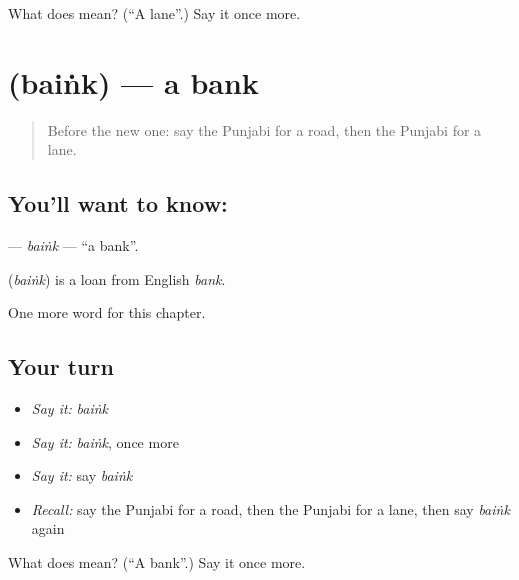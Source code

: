 \begin{tcolorbox}[breakable,colback=teal!4,colframe=teal!35!black,title={Before you move on}]
What does  mean? (\textquotedblleft{}A lane\textquotedblright{}.) Say it once more.
\end{tcolorbox}
\section[\texorpdfstring{\pa{ਬੈਂਕ} (baiṅk)}{ਬੈਂਕ (baiṅk)}]{ (baiṅk) — a bank}

\label{lesson:PA-C90-baink}



\begin{quote}
Before the new one: say the Punjabi for a road, then the Punjabi for a lane.
\end{quote}

\subsection*{You'll want to know: }
\textbf{} — \emph{baiṅk} — \textquotedblleft{}a bank\textquotedblright{}.

\begin{cousinweb}
\textbf{} (\emph{baiṅk}) is a loan from English \emph{bank}.
\end{cousinweb}

\begin{grammarlens}[title={What you've built}]
One more word for this chapter.
\end{grammarlens}

\subsection*{Your turn}
\begin{itemize}
\raggedright
  \item \emph{Say it:} \emph{baiṅk}
  \item \emph{Say it:} \emph{baiṅk}, once more
  \item \emph{Say it:} say \emph{baiṅk}
  \item \emph{Recall:} say the Punjabi for a road, then the Punjabi for a lane, then say \emph{baiṅk} again
\end{itemize}

\begin{tcolorbox}[breakable,colback=teal!4,colframe=teal!35!black,title={Before you move on}]
What does  mean? (\textquotedblleft{}A bank\textquotedblright{}.) Say it once more.
\end{tcolorbox}
